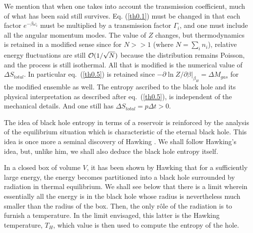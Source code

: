 \documentclass[12pt,oneside]{report}
\begin{document}
We mention that when one takes into account the transmission
coefficient, much of what has been said still survives. Eq.
(\ref{th0.1}) must be changed in that each factor $ e^{-\beta
\omega_i}$  must be multiplied by a transmission factor $\Gamma_i$, and one must include
all the angular momentum modes.
The value of $Z$ changes, but thermodynamics is retained in a
modified sense since for $ N >> 1$ (where $N= \sum_i n_i$), relative energy fluctuations
are still ${ \cal{O}} (1/ \sqrt N) $ because the distribution remains Poisson, 
and the process is still isothermal.
All that is modified is the numerical value of $\Delta S_{total}$. In
particular eq.~(\ref{th0.5}) is retained since $ -\partial \ln Z/
\partial \beta \vert_{\beta_H} = \Delta M_{gas}$ for the modified
ensemble as well. The entropy ascribed to the black hole and its
physical interpretation as described after eq.~(\ref{th0.5}), is
independent of the mechanical details. 
And one still has $\Delta S_{total} = p \Delta t >0$.

The idea of black hole entropy in terms of a reservoir is
reinforced by the analysis of the equilibrium situation which is
characteristic of the eternal black hole. This idea is once more
a seminal discovery of Hawking \cite{Hawk2}. We shall follow Hawking's idea,
but, unlike him, we shall also deduce the black hole entropy
itself.
 
In a closed box of volume $V$, it has been shown by Hawking
that for a sufficiently large energy, the energy becomes partitioned into 
a black hole surrounded by radiation in thermal equilibrium. We 
shall see below that there is a limit wherein 
essentially all the energy is in the black hole
whose radius is nevertheless 
much smaller than the radius of the box. Then, the only
r\^ole of the radiation is to furnish a temperature.
 In the limit envisaged, this latter is the Hawking temperature, $T_H$,
which value is then used to compute the entropy of the hole.
\end{document}
